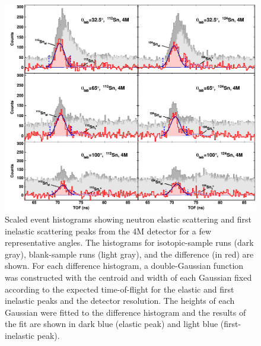 \begin{figure}[ht]
    \centering
    \includegraphics[width = 1.0\textwidth]{figures/tiledAngleData.png}
    \caption[Scaled event histograms showing neutron elastic scattering peak]
    {
        Scaled event histograms showing neutron elastic scattering and first
        inelastic scattering peaks from the 4M detector for a few representative angles. The
        histograms for isotopic-sample runs (dark gray),
        blank-sample runs (light gray), and the difference (in red) are shown.
        For each difference histogram, a double-Gaussian function
        was constructed with the centroid and width of each Gaussian fixed
        according to the expected time-of-flight for the elastic and first
        inelastic peaks and the detector resolution. The heights of each
        Gaussian were fitted to the difference histogram and the results of the
        fit are shown in dark blue (elastic peak) and light blue (first-inelastic peak).
    }
    \label{tiledAngleData}
\end{figure}

